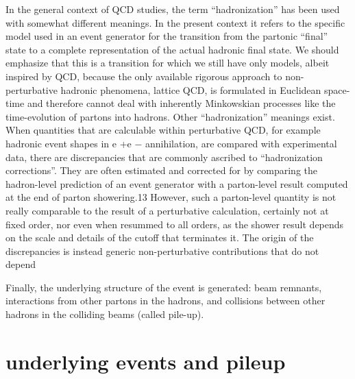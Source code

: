 In the general context of QCD studies, the term “hadronization” has been
used with somewhat different meanings. In the present context it refers to the
specific model used in an event generator for the transition from the partonic
“final” state to a complete representation of the actual hadronic final state.
We should emphasize that this is a transition for which we still have only
models, albeit inspired by QCD, because the only available rigorous approach
to non-perturbative hadronic phenomena, lattice QCD, is formulated in Euclidean
space-time and therefore cannot deal with inherently Minkowskian
processes like the time-evolution of partons into hadrons.
Other “hadronization” meanings exist. When quantities that are calculable
within perturbative QCD, for example hadronic event shapes in e
+e
−
annihilation, are compared with experimental data, there are discrepancies
that are commonly ascribed to “hadronization corrections”. They are often
estimated and corrected for by comparing the hadron-level prediction of an
event generator with a parton-level result computed at the end of parton
showering.13 However, such a parton-level quantity is not really comparable
to the result of a perturbative calculation, certainly not at fixed order,
nor even when resummed to all orders, as the shower result depends on the
scale and details of the cutoff that terminates it. The origin of the discrepancies
is instead generic non-perturbative contributions that do not depend

































Finally,
the underlying structure of the event is generated: beam remnants, interactions from other partons in the
hadrons, and collisions between other hadrons in the colliding beams (called pile-up).





\section{underlying events and pileup }

